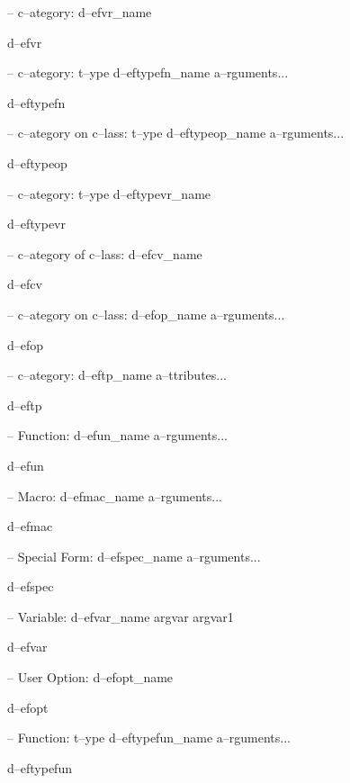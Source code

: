 \documentclass{book}
\begin{document}
\begin{titlepage}
\hbox{}-- c--ategory: d--efvr\_name


%
d--efvr

\hbox{}-- c--ategory: t--ype d--eftypefn\_name a--rguments...


%
d--eftypefn

\hbox{}-- c--ategory on c--lass: t--ype d--eftypeop\_name a--rguments...


%
d--eftypeop

\hbox{}-- c--ategory: t--ype d--eftypevr\_name


%
d--eftypevr

\hbox{}-- c--ategory of c--lass: d--efcv\_name


%
d--efcv

\hbox{}-- c--ategory on c--lass: d--efop\_name a--rguments...


%
d--efop

\hbox{}-- c--ategory: d--eftp\_name a--ttributes...


%
d--eftp

\hbox{}-- Function: d--efun\_name a--rguments...


%
d--efun

\hbox{}-- Macro: d--efmac\_name a--rguments...


%
d--efmac

\hbox{}-- Special Form: d--efspec\_name a--rguments...


%
d--efspec

\hbox{}-- Variable: d--efvar\_name argvar argvar1


%
d--efvar

\hbox{}-- User Option: d--efopt\_name


%
d--efopt

\hbox{}-- Function: t--ype d--eftypefun\_name a--rguments...


%
d--eftypefun


\end{titlepage}
\end{document}

